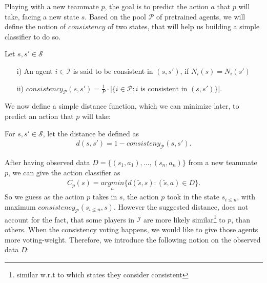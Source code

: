 \documentclass[a4paper, 11pt]{article}
\begin{document}
	
	Playing with a new teammate $p$, the goal is to predict the action $a$ that $p$ will take, facing a new state $s$. Based on the pool $\mathcal{P}$ of pretrained agents, we will define the notion of $consistency$ of two states, that will help us building a simple classifier to do so.
	\begin{Def}[consistency] {Let $s,s'\in\mathcal{S}$ }
		\begin{itemize}
			\item[i)] An agent $i\in\mathcal{I}$ is said to be consistent in $(s,s')$, if $N_i(s) = N_i(s')$
			\item[ii)] $consistency_{\mathcal{P}}(s,s') = \frac{1}{P}\cdot|\{ i \in\mathcal{P}: i \text{ is consistent in } (s,s') \}|$.
		\end{itemize}		
	\end{Def}
 	We now define a simple distance function, which we can minimize later, to predict an action that $p$ will take:
	\begin{Def}[Distance] {For $s,s'\in\mathcal{S}$, let  the distance be defined as}
	\begin{align*}
	d(s, s') = 1 - consisteny_{\mathcal{P}}(s,s').
	\end{align*}
	\end{Def}
	After having observed data $D = \{(s_1, a_1),...,(s_n,a_n)\}$ from a new teammate $p$, we can give the action classifier as 
	\begin{align*}
	C_p(s) = \underset{a}{argmin} \{ d(\tilde{s}, s): (\tilde{s}, a)\in D \}.
	\end{align*}
	So we guess as the action $p$ takes in $s$, the action $p$ took in the state $s_{i\leq n}$,  with maximum $consistency_{\mathcal{P}}(s_{i\leq n}, s)$. However the suggested distance, does not account for the fact, that some players in $\mathcal{I}$ are more likely similar\footnote{similar w.r.t to which states they consider consistent} to $p$, than others. When the consistency voting happens, we would like to give those agents more voting-weight. Therefore, we introduce the following notion on the observed data $D$:
\end{document}
